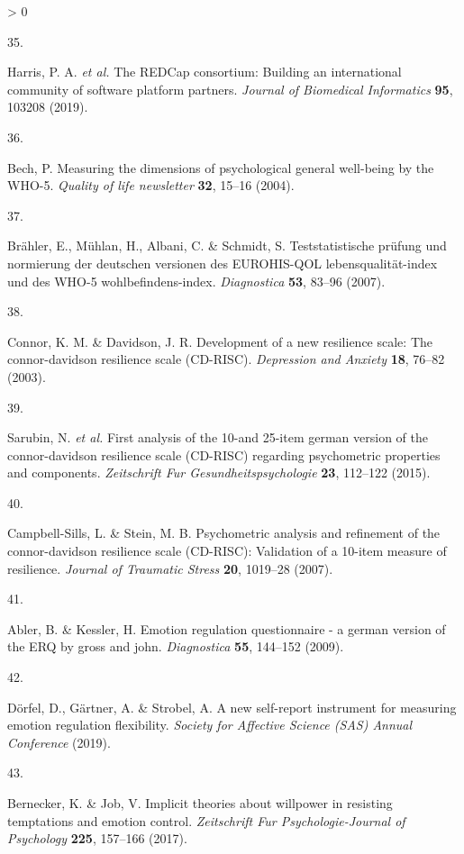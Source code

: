 \documentclass[
  english,
  man,floatsintext]{apa6}
\newlength{\cslhangindent}
\newlength{\csllabelwidth}
\newenvironment{CSLReferences}[2] %
 {%
  \setlength{\parindent}{0pt}
  \ifodd #1 \everypar{\setlength{\hangindent}{\cslhangindent}}\ignorespaces\fi
  \ifnum #2 > 0
  \setlength{\parskip}{#2\baselineskip}
  \fi
 }%
 {}
\newcommand{\CSLLeftMargin}[1]{\parbox[t]{\csllabelwidth}{#1}}
\newcommand{\CSLRightInline}[1]{\parbox[t]{\linewidth - \csllabelwidth}{#1}\break}
\begin{document}
\begin{CSLReferences}{0}{0}
\leavevmode\hypertarget{ref-Harris2019}{}%
\CSLLeftMargin{35. }
\CSLRightInline{Harris, P. A. \emph{et al.} The {REDCap} consortium: {Building} an international community of software platform partners. \emph{Journal of Biomedical Informatics} \textbf{95}, 103208 (2019).}

\leavevmode\hypertarget{ref-Bech2004}{}%
\CSLLeftMargin{36. }
\CSLRightInline{Bech, P. Measuring the dimensions of psychological general well-being by the WHO-5. \emph{Quality of life newsletter} \textbf{32}, 15--16 (2004).}

\leavevmode\hypertarget{ref-Braehler2007}{}%
\CSLLeftMargin{37. }
\CSLRightInline{Brähler, E., Mühlan, H., Albani, C. \& Schmidt, S. Teststatistische pr{ü}fung und normierung der deutschen versionen des EUROHIS-QOL lebensqualit{ä}t-index und des WHO-5 wohlbefindens-index. \emph{Diagnostica} \textbf{53}, 83--96 (2007).}

\leavevmode\hypertarget{ref-Connor2003}{}%
\CSLLeftMargin{38. }
\CSLRightInline{Connor, K. M. \& Davidson, J. R. Development of a new resilience scale: The connor-davidson resilience scale (CD-RISC). \emph{Depression and Anxiety} \textbf{18}, 76--82 (2003).}

\leavevmode\hypertarget{ref-Sarubin2015}{}%
\CSLLeftMargin{39. }
\CSLRightInline{Sarubin, N. \emph{et al.} First analysis of the 10-and 25-item german version of the connor-davidson resilience scale (CD-RISC) regarding psychometric properties and components. \emph{Zeitschrift Fur Gesundheitspsychologie} \textbf{23}, 112--122 (2015).}

\leavevmode\hypertarget{ref-Campbell-Sills2007}{}%
\CSLLeftMargin{40. }
\CSLRightInline{Campbell-Sills, L. \& Stein, M. B. Psychometric analysis and refinement of the connor-davidson resilience scale (CD-RISC): Validation of a 10-item measure of resilience. \emph{Journal of Traumatic Stress} \textbf{20}, 1019--28 (2007).}

\leavevmode\hypertarget{ref-Abler2009}{}%
\CSLLeftMargin{41. }
\CSLRightInline{Abler, B. \& Kessler, H. Emotion regulation questionnaire - a german version of the ERQ by gross and john. \emph{Diagnostica} \textbf{55}, 144--152 (2009).}

\leavevmode\hypertarget{ref-Doerfel2019}{}%
\CSLLeftMargin{42. }
\CSLRightInline{Dörfel, D., Gärtner, A. \& Strobel, A. A new self-report instrument for measuring emotion regulation flexibility. \emph{Society for Affective Science (SAS) Annual Conference} (2019).}

\leavevmode\hypertarget{ref-Bernecker2017}{}%
\CSLLeftMargin{43. }
\CSLRightInline{Bernecker, K. \& Job, V. Implicit theories about willpower in resisting temptations and emotion control. \emph{Zeitschrift Fur Psychologie-Journal of Psychology} \textbf{225}, 157--166 (2017).}


\end{CSLReferences}
\end{document}
